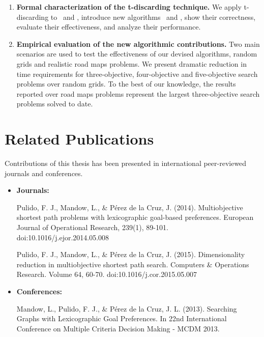 \begin{enumerate}
	\item \textbf{Formal characterization of the t-discarding technique.} We apply t-discarding to \namoa \ and \lexgo, introduce new algorithms \namoate \ and \lexgote, show their correctness, evaluate their effectiveness, and analyze their performance.  

	\item \textbf{Empirical evaluation of the new algorithmic contributions.} Two main scenarios are used to test the effectiveness of our devised algorithms, random grids and realistic road maps problems. We present dramatic reduction in time requirements for three-objective, four-objective and five-objective search problems over random grids. To the best of our knowledge, the results reported over road maps problems represent the largest three-objective search problems solved to date. 		
\end{enumerate}

\section{Related Publications}
\label{ChapIntroduction:sec:publications}

Contributions of this thesis has been presented in international peer-reviewed journals and conferences.

\begin{itemize}

    \item \textbf{\large Journals:}
\par
Pulido, F. J., Mandow, L., \& P\'{e}rez de la Cruz, J. (2014). Multiobjective shortest path problems with lexicographic goal-based preferences. European Journal of Operational Research, 239(1), 89-101. doi:10.1016/j.ejor.2014.05.008
\par 
Pulido, F. J., Mandow, L., \& P\'{e}rez de la Cruz, J. (2015). Dimensionality reduction in multiobjective shortest path search. Computers \& Operations Research. Volume 64, 60-70. doi:10.1016/j.cor.2015.05.007
%
    \item \textbf{\large Conferences:}
\par
Mandow, L., Pulido, F. J., \& P\'{e}rez de la Cruz, J. L. (2013). Searching Graphs with Lexicographic Goal Preferences. In 22nd International Conference on Multiple Criteria Decision Making - MCDM 2013.

\end{itemize}

